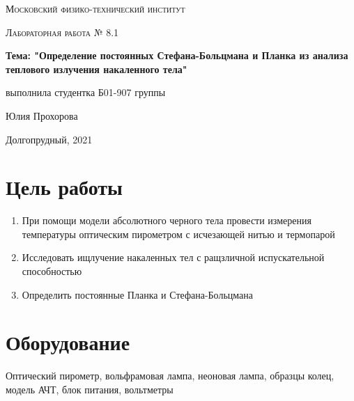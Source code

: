\documentclass[a4paper]{article}
\begin{document}
\graphicspath{ {pictures/} }

\begin{titlepage}
	\centering
	\vspace{5cm}
    {\scshape\LARGE Московский физико-технический институт\par}
	\vspace{5cm}
	{\scshape\Large Лабораторная работа № 8.1 \par}
	\vspace{1cm}
    {\huge\bfseries Тема: "Определение постоянных Стефана-Больцмана и Планка из анализа
    теплового излучения накаленного тела" \par}
	\vspace{1cm}
	\vfill
    \begin{flushright}
        {\large выполнила студентка Б01-907 группы}\par
        \vspace{0.3cm}
        {\LARGE Юлия Прохорова}
    \end{flushright}
	\vfill
Долгопрудный, 2021
\end{titlepage}

\pagestyle{fancy} 
\fancyhead[C]{}
\fancyfoot[C]{ \noindent\rule{\textwidth}{0.4pt} \thepage }

\tableofcontents

\newpage



\section{Цель работы}

\begin{enumerate}
    \item При помощи модели абсолютного черного тела провести измерения температуры оптическим пирометром
    с исчезающей нитью и термопарой
    \item Исследовать ищлучение накаленных тел с ращзличной испускательной способностью
    \item Определить постоянные Планка и Стефана-Больцмана
\end{enumerate}



\section{Оборудование}
    Оптический пирометр, вольфрамовая лампа, неоновая лампа, образцы колец, модель АЧТ, блок питания, вольтметры
\end{document}
